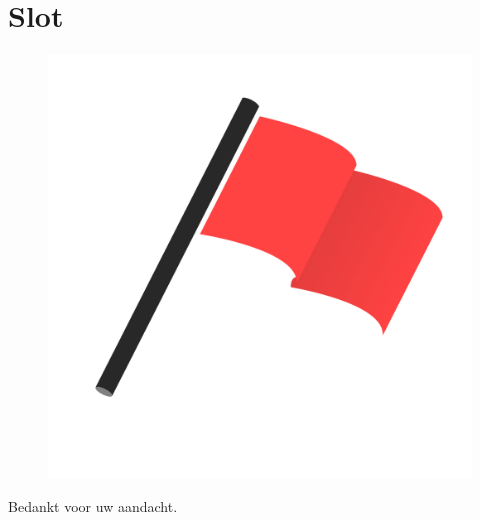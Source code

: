 \documentclass[11pt,t]{beamer}
\begin{document}
\section{Slot}
\begin{frame}
\vspace{0.5in}
\begin{center}
\begin{figure}
\includegraphics[scale=0.3]{images/flagicon}
\end{figure}

Bedankt voor uw aandacht.
\end{center}
\end{frame}
\end{document}

